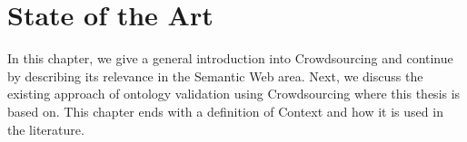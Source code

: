 \chapter{State of the Art}\label{chap:state_of_the_art}
In this chapter, we give a general introduction into Crowdsourcing and continue by describing its relevance in the Semantic Web area. Next, we discuss the existing approach of ontology validation using Crowdsourcing where this thesis is based on. This chapter ends with a definition of Context and how it is used in the literature.











